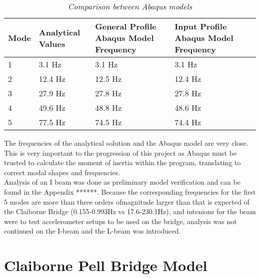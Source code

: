 \begin{table}[H]

\begin{center}

 \begin{tabular}{|l| p{3.5cm}| p{3cm}| p{3cm}| p{3cm}|}

 \hline

 \textbf{Mode} & \textbf{Analytical Values} & \textbf{General Profile Abaqus Model Frequency}& 

\textbf{Input Profile Abaqus Model Frequency} \\\hline

 1 & 3.1 Hz & 3.1 Hz & 3.1 Hz \\\hline

 2 & 12.4 Hz & 12.5 Hz & 12.4 Hz \\\hline

 3 & 27.9 Hz & 27.8 Hz & 27.8 Hz \\\hline

 4 & 49.6 Hz & 48.8 Hz & 48.6 Hz \\\hline

 5 & 77.5 Hz & 74.5 Hz & 74.4 Hz \\\hline

 \end{tabular}

 \caption{\textit{Comparison between Abaqus models}}

 \label{tab:FEM_Abaqus_Comp}

\end{center}

\end{table}

\indent The frequencies of the analytical solution and the Abaqus model are very close. This is very important to the progression of this project as Abaqus must be trusted to calculate the moment of inertia within the program, translating to correct modal shapes and frequencies. \\
\indent Analysis of an I beam was done as preliminary model verification and can be found in the Appendix ******. Because the corresponding frequencies for the first 5 modes are more than three orders ofmagnitude larger than that is expected of the Claiborne Bridge (0.155-0.993Hz vs 17.6-230.1Hz), and intenions for the beam were to test accelerometer setups to be used on the bridge, analysis was not continued on the I-beam and the L-beam was introduced. 

\section{Claiborne Pell Bridge Model}


